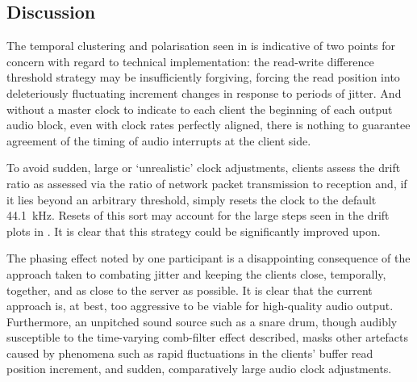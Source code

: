 \subsection{Discussion}\label{subsec:discussion}

The temporal clustering and polarisation seen in
 is indicative of two points for
concern with regard to technical implementation:
the read-write difference threshold strategy may be insufficiently forgiving,
forcing the read position into deleteriously fluctuating increment changes in
response to periods of jitter.
And without a master clock to indicate to each client the beginning of each
output audio block, even with clock rates perfectly aligned, there is nothing
to guarantee agreement of the timing of audio interrupts at the client side.

To avoid sudden, large or `unrealistic' clock adjustments, clients assess
the drift ratio as assessed via the ratio of network packet
transmission to reception and, if it lies beyond an arbitrary threshold,
simply resets the clock to the default \qty{44.1}{\kHz}.
Resets of this sort may account for the large steps seen in the drift plots
in .
It is clear that this strategy could be significantly improved upon.

The phasing effect noted by one participant is a disappointing consequence
of the approach taken to combating jitter and keeping the clients close,
temporally, together, and as close to the server as possible.
It is clear that the current approach is, at best, too aggressive to be viable
for high-quality audio output.
Furthermore, an unpitched sound source such as a snare drum, though audibly
susceptible to the time-varying comb-filter effect described, masks other
artefacts caused by phenomena such as rapid fluctuations in the clients' buffer
read position increment, and sudden, comparatively large audio clock
adjustments.
